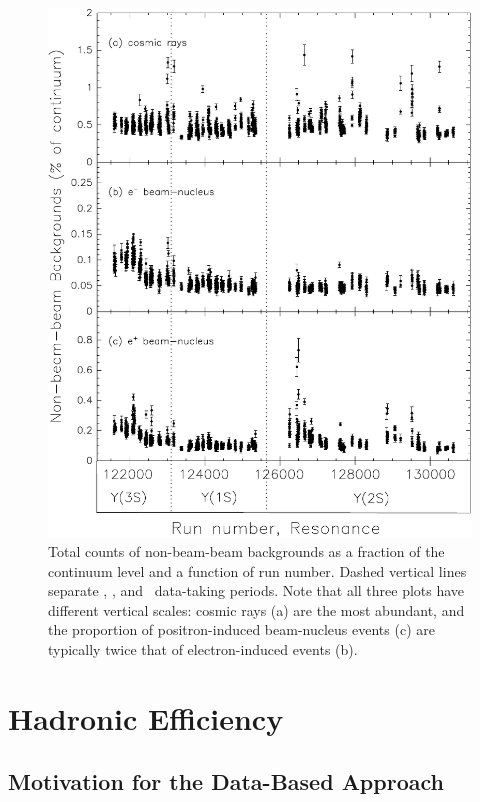 \documentclass{cornell}
\begin{document}
\begin{figure}[p]
  \begin{center}
    \includegraphics[width=0.85\linewidth]{plots/backgroundsvsrun}
  \end{center}
  \caption[Fraction of non-beam-beam backgrounds in every
  run]{\label{backgroundsvsrun} Total counts of non-beam-beam
  backgrounds as a fraction of the continuum level and a function of
  run number.  Dashed vertical lines separate \usss, \us, and \uss\
  data-taking periods.  Note that all three plots have different
  vertical scales: cosmic rays (a) are the most abundant, and the
  proportion of positron-induced beam-nucleus events (c) are typically
  twice that of electron-induced events (b).}
\end{figure}

\chapter{Hadronic Efficiency}
\label{chp:efficiency}

\section{Motivation for the Data-Based Approach}
\end{document}
